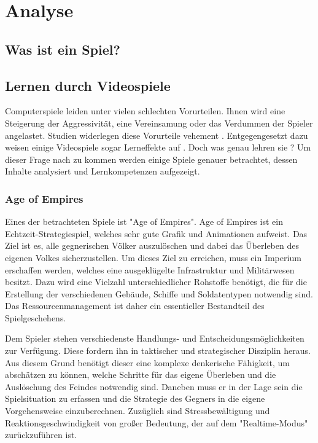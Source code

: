 \section{Analyse}
\subsection{Was ist ein Spiel?}
\subsection{Lernen durch Videospiele}
Computerspiele leiden unter vielen schlechten Vorurteilen. Ihnen wird eine Steigerung der Aggressivität, eine Vereinsamung oder das Verdummen der Spieler angelastet. Studien widerlegen diese Vorurteile vehement \cite{psylex.de2012}. Entgegengesetzt dazu weisen einige Videospiele sogar Lerneffekte auf \cite{paradisiredaktion2010}. Doch was genau lehren sie ? Um dieser Frage nach zu kommen werden einige Spiele genauer betrachtet, dessen Inhalte analysiert und Lernkompetenzen aufgezeigt.

\subsubsection{Age of Empires}
Eines der betrachteten Spiele ist "Age of Empires". Age of Empires ist ein Echtzeit-Strategiespiel, welches sehr gute Grafik und Animationen aufweist. Das Ziel ist es, alle gegnerischen Völker auszulöschen und dabei das Überleben des eigenen Volkes sicherzustellen. Um dieses Ziel zu erreichen, muss ein Imperium erschaffen werden, welches eine ausgeklügelte Infrastruktur und Militärwesen besitzt. Dazu wird eine Vielzahl unterschiedlicher Rohstoffe benötigt, die für die Erstellung der verschiedenen Gebäude, Schiffe und Soldatentypen notwendig sind. Das Ressourcenmanagement ist daher ein essentieller Bestandteil des Spielgeschehens.

Dem Spieler stehen verschiedenste Handlungs- und Entscheidungsmöglichkeiten zur Verfügung. Diese fordern ihn in taktischer und strategischer Disziplin heraus. Aus diesem Grund benötigt dieser eine komplexe denkerische Fähigkeit, um abschätzen zu können, welche Schritte für das eigene Überleben und die Auslöschung des Feindes notwendig sind. Daneben muss er in der Lage sein die Spielsituation zu erfassen und die Strategie des Gegners in die eigene Vorgehensweise einzuberechnen. Zuzüglich sind Stressbewältigung und Reaktionsgeschwindigkeit von großer Bedeutung, der auf dem "Realtime-Modus" zurückzuführen ist. 

